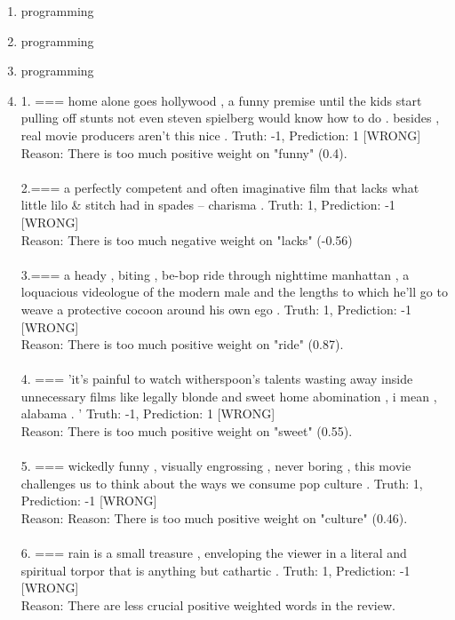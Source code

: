 \documentclass[12pt]{article}
\begin{document}
\begin{enumerate}[label=(\alph*)]
  \item programming

  \item programming

  \item programming

  \item
  1. === home alone goes hollywood , a funny premise until the kids start pulling off stunts not even steven spielberg would know how to do . besides , real movie producers aren't this nice .
  Truth: -1, Prediction: 1 [WRONG]\\
  Reason: There is too much positive weight on "funny" (0.4).\\\\
  2.=== a perfectly competent and often imaginative film that lacks what little lilo & stitch had in spades -- charisma .
  Truth: 1, Prediction: -1 [WRONG]\\
  Reason: There is too much negative weight on "lacks" (-0.56)\\\\
  3.=== a heady , biting , be-bop ride through nighttime manhattan , a loquacious videologue of the modern male and the lengths to which he'll go to weave a protective cocoon around his own ego .
  Truth: 1, Prediction: -1 [WRONG]\\
  Reason: There is too much positive weight on "ride" (0.87).\\\\
  4. === 'it's painful to watch witherspoon's talents wasting away inside unnecessary films like legally blonde and sweet home abomination , i mean , alabama . '
  Truth: -1, Prediction: 1 [WRONG]\\
  Reason: There is too much positive weight on "sweet" (0.55).\\\\
  5. === wickedly funny , visually engrossing , never boring , this movie challenges us to think about the ways we consume pop culture .
  Truth: 1, Prediction: -1 [WRONG]\\
  Reason:   Reason: There is too much positive weight on "culture" (0.46).\\\\
  6. === rain is a small treasure , enveloping the viewer in a literal and spiritual torpor that is anything but cathartic .
  Truth: 1, Prediction: -1 [WRONG]\\
  Reason: There are less crucial positive weighted words in the review.\\\\

\end{enumerate}
\end{document}
